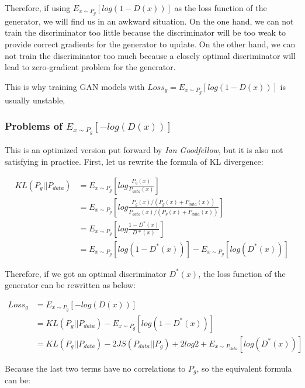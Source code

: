 \documentclass{article} %
\begin{document}
Therefore, if using $E_{x \sim P_g}[log(1-D(x))]$ as the loss function of the generator, we will find us in an awkward situation. On the one hand, we can not train the discriminator too little because the discriminator will be too weak to provide correct gradients for the generator to update. On the other hand, we can not train the discriminator too much because a closely optimal discriminator will lead to zero-gradient problem for the generator.

This is why training GAN models with $Loss_g = E_{x \sim P_g}[log(1-D(x))]$ is usually unstable,

\subsubsection{Problems of $E_{x \sim P_g}[-log(D(x))]$}

This is an optimized version put forward by \emph{Ian Goodfellow}, but it is also not satisfying in practice. First, let us rewrite the formula of KL divergence:

\begin{equation}
    \begin{split}
        KL(P_g||P_{data}) & = E_{x \sim P_g}[log\frac{P_g(x)}{P_{data}(x)}] \\
          & = E_{x \sim P_g}[log\frac{P_g(x)/(P_g(x)+P_{data}(x))}{P_{data}(x)/(P_g(x)+P_{data}(x))}] \\
          & = E_{x \sim P_g}[log\frac{1-D^{*}(x)}{D{*}(x)}] \\
          & = E_{x \sim P_g}[log(1-D^{*}(x))]-E_{x \sim P_g}[log(D^{*}(x))]
    \end{split}
\end{equation}

Therefore, if we got an optimal discriminator $D^{*}(x)$, the loss function of the generator can be rewritten as below:

\begin{equation}
    \begin{split}
        Loss_g & = E_{x \sim P_g}[-log(D(x))] \\
          & = KL(P_g||P_{data}) - E_{x \sim P_g}[log(1-D^{*}(x))] \\
          & = KL(P_g||P_{data}) - 2JS(P_{data}||P_g)+2log2+E_{x \sim P_{data}}[log(D^{*}(x))]
    \end{split}
\end{equation}

Because the last two terms have no correlations to $P_g$, so the equivalent formula can be:
\end{document}
